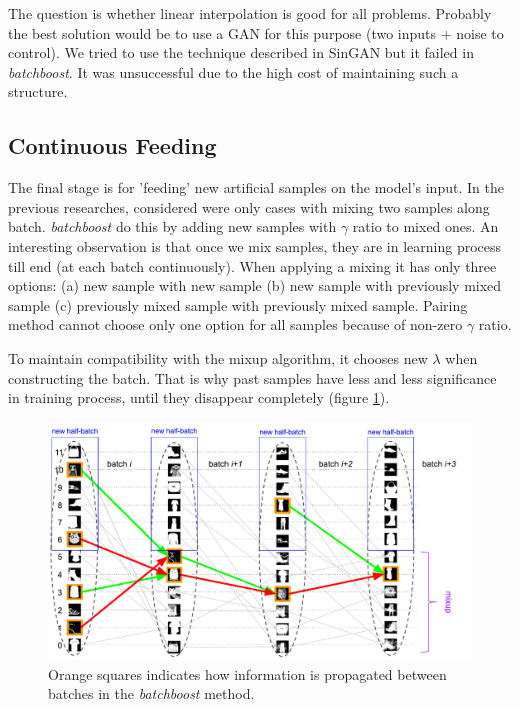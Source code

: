 \documentclass{article}
\begin{document}
The question is whether linear interpolation is good for all problems.
Probably the best solution would be to use a GAN for this purpose (two inputs +
noise to control). We tried to use the technique described in
SinGAN\cite{shaham2019singan} but it
failed in \emph{batchboost}.  It was unsuccessful due to the high cost of
maintaining such a structure.

\subsection{Continuous Feeding}
\label{sec:feeding}

The final stage is for 'feeding' new artificial samples on the model's input. In
the previous researches, considered were only cases with mixing two samples along
batch. \emph{batchboost} do this by adding new samples with $\gamma$ ratio to
mixed ones.
%
An interesting observation is that once we mix samples, they are in learning
process till end (at each batch continuously).
When applying a mixing it has only three options: (a) new sample with new sample
(b) new sample with previously mixed sample (c) previously mixed sample with
previously mixed sample. Pairing method cannot choose only one option for all samples
because of non-zero $\gamma$ ratio.

To maintain compatibility with the mixup
algorithm, it chooses new $\lambda$ when constructing the batch.
That is why past samples have less and less significance in training process,
until they disappear completely (figure \ref{fig:feeding}).

\begin{figure}[H]
  \hspace{0.5cm}
  \includegraphics[width=\linewidth]{figure-feeding}
  \caption{Orange squares indicates how information is propagated between
	  batches in the \emph{batchboost} method.}
  \label{fig:feeding}
\end{figure}
\end{document}
